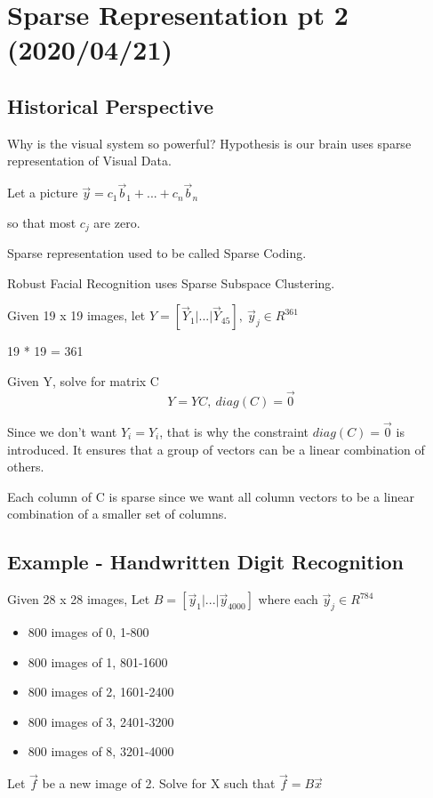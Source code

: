 \documentclass[11pt]{article}
\begin{document}
\section{Sparse Representation pt 2 (2020/04/21)}
\label{sec:orgacffba8}
\subsection{Historical Perspective}
\label{sec:orgfbabc88}
Why is the visual system so powerful? Hypothesis is our brain uses sparse
representation of Visual Data.

Let a picture \(\vec y = c_1 \vec b_1 + ... + c_n \vec b_n\)

so that most \(c_j\) are zero.

Sparse representation used to be called Sparse Coding.

Robust Facial Recognition uses Sparse Subspace Clustering.

Given 19 x 19 images, let \(Y = [\vec Y_1 | ... | \vec Y_{45}], \ \vec y_j \in
R^{361}\)

19 * 19 = 361

Given Y, solve for matrix C
$$
Y = YC, \ diag(C) = \vec 0
$$

Since we don't want \(Y_i = Y_i\), that is why the constraint \(diag(C) = \vec 0\)
is introduced. It ensures that a group of vectors can be a linear combination of
others.

Each column of C is sparse since we want all column vectors to be a linear
combination of a smaller set of columns.


\subsection{Example - Handwritten Digit Recognition}
\label{sec:orga24deda}

Given 28 x 28 images,
Let \(B = [\vec y_1 | ... | \vec y_{4000}]\) where each \(\vec y_j \in R^{784}\)

\begin{itemize}
\item 800 images of 0, 1-800
\item 800 images of 1, 801-1600
\item 800 images of 2, 1601-2400
\item 800 images of 3, 2401-3200
\item 800 images of 8, 3201-4000
\end{itemize}

Let \(\vec f\) be a new image of 2. Solve for X such that \(\vec f = B \vec x\)
\end{document}
